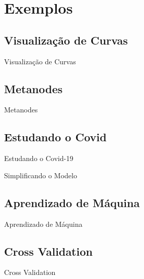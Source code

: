 \documentclass{beamer}
\begin{document}
\section{Exemplos}

\subsection{Visualização de Curvas}
\begin{frame}{Visualização de Curvas}
    \centering
    
\end{frame}


\subsection{Metanodes}
\begin{frame}{Metanodes}
    \centering
    
\end{frame}

\subsection{Estudando o Covid}
\begin{frame}{Estudando o Covid-19}
    \centering
    
\end{frame}

\begin{frame}{Simplificando o Modelo}
    \centering
    
\end{frame}

\subsection{Aprendizado de Máquina}
\begin{frame}{Aprendizado de Máquina}
    \centering
    
\end{frame}

\subsection{Cross Validation}
\begin{frame}{Cross Validation}
    \centering
    
\end{frame}
\end{document}
